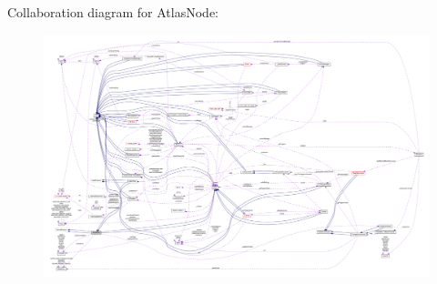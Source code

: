 Collaboration diagram for Atlas\+Node\+:
\nopagebreak
\begin{figure}[H]
\begin{center}
\leavevmode
\includegraphics[width=350pt]{classAtlasNode__coll__graph}
\end{center}
\end{figure}
